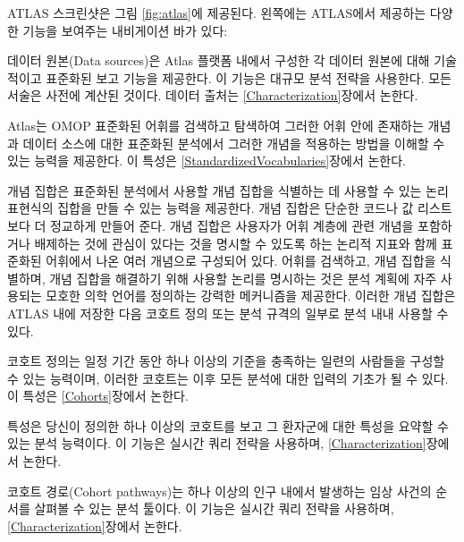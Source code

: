 \documentclass[11pt]{book}
\providecommand{\tightlist}{%
  \setlength{\itemsep}{0pt}\setlength{\parskip}{0pt}}
\theoremstyle{definition}
\theoremstyle{definition}
\theoremstyle{definition}
\theoremstyle{remark}
\begin{document}
ATLAS 스크린샷은 그림 \ref{fig:atlas}에 제공된다. 왼쪽에는 ATLAS에서
제공하는 다양한 기능을 보여주는 내비게이션 바가 있다:

\begin{description}
\tightlist
\item[Data Sources \index{ATLAS!Data Sources}
\index{Achilles|see {ATLAS!data sources}}]
데이터 원본(Data sources)은 Atlas 플랫폼 내에서 구성한 각 데이터 원본에
대해 기술적이고 표준화된 보고 기능을 제공한다. 이 기능은 대규모 분석
전략을 사용한다. 모든 서술은 사전에 계산된 것이다. 데이터 출처는
\ref{Characterization}장에서 논한다.
\item[Vocabulary Search \index{ATLAS!vocabulary search}]
Atlas는 OMOP 표준화된 어휘를 검색하고 탐색하여 그러한 어휘 안에 존재하는
개념과 데이터 소스에 대한 표준화된 분석에서 그러한 개념을 적용하는
방법을 이해할 수 있는 능력을 제공한다. 이 특성은
\ref{StandardizedVocabularies}장에서 논한다.
\item[Concept Sets \index{ATLAS!concept sets}]
개념 집합은 표준화된 분석에서 사용할 개념 집합을 식별하는 데 사용할 수
있는 논리 표현식의 집합을 만들 수 있는 능력을 제공한다. 개념 집합은
단순한 코드나 값 리스트보다 더 정교하게 만들어 준다. 개념 집합은
사용자가 어휘 계층에 관련 개념을 포함하거나 배제하는 것에 관심이 있다는
것을 명시할 수 있도록 하는 논리적 지표와 함께 표준화된 어휘에서 나온
여러 개념으로 구성되어 있다. 어휘를 검색하고, 개념 집합을 식별하며, 개념
집합을 해결하기 위해 사용할 논리를 명시하는 것은 분석 계획에 자주
사용되는 모호한 의학 언어를 정의하는 강력한 메커니즘을 제공한다. 이러한
개념 집합은 ATLAS 내에 저장한 다음 코호트 정의 또는 분석 규격의 일부로
분석 내내 사용할 수 있다.
\item[Cohort Definitions \index{ATLAS!cohort definitions}]
코호트 정의는 일정 기간 동안 하나 이상의 기준을 충족하는 일련의 사람들을
구성할 수 있는 능력이며, 이러한 코호트는 이후 모든 분석에 대한 입력의
기초가 될 수 있다. 이 특성은 \ref{Cohorts}장에서 논한다.
\item[Characterizations \index{ATLAS!cohort characterization}]
특성은 당신이 정의한 하나 이상의 코호트를 보고 그 환자군에 대한 특성을
요약할 수 있는 분석 능력이다. 이 기능은 실시간 쿼리 전략을 사용하며,
\ref{Characterization}장에서 논한다.
\item[Cohort Pathways \index{ATLAS!cohort pathways}]
코호트 경로(Cohort pathways)는 하나 이상의 인구 내에서 발생하는 임상
사건의 순서를 살펴볼 수 있는 분석 툴이다. 이 기능은 실시간 쿼리 전략을
사용하며, \ref{Characterization}장에서 논한다.
\item[Incidence Rates \index{ATLAS!incidence rates}]

\end{description}
\end{document}

